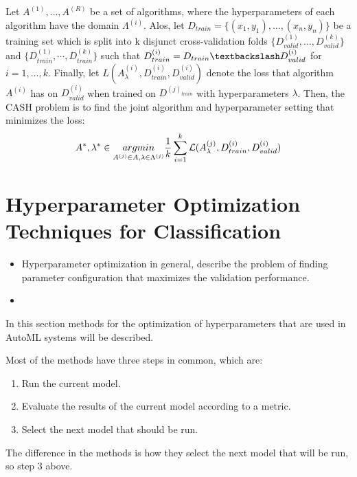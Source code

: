\begin{definition} 
\label{def:cash}
Let $A^(1), \dots, A^(R)$ be a set of algorithms, where the hyperparameters of each algorithm have the domain $\Lambda^(i)$.
Alos, let $ D_{train} =  \lbrace (x_1, y_1), \dots, (x_n, y_n) \rbrace$ be a training set which is split into k  disjunct cross-validation folds $\lbrace D^{(1)}_{valid}, \dots, D^{(k)}_{valid} \rbrace$ and $\lbrace D^{(1)}_{train}, \cdots, D^{(k)}_{train} \rbrace$  such that $D^{(i)}_{train} = D_{train} \textbackslash D^{(i)}_{valid}$ for $i=1, \dots, k$.
Finally, let $L( A^{(i)}_{\lambda}, D^{(i)}_{train}, D^{(i)}_{valid})$ denote the loss that algorithm $A^{(i)}$ has on $D^{(i)}_{valid}$ when trained on $D^{(j)_{train}}$ with hyperparameters $\lambda$.
Then, the \gls{CASH} problem is to find the joint algorithm and hyperparameter setting that minimizes the loss:
\begin{equation*}
    A^*, \lambda^* \in \underset{A^{(j)}\in A, \lambda \in \Lambda^{(j)}}{argmin} \frac{1}{k} \sum_{i=1}^k \mathcal{L}(A^{(j)}_{\lambda}, D^{(i)}_{train}, D^{(i)}_{valid})
\end{equation*}

\end{definition}



\section{Hyperparameter Optimization Techniques for Classification}

\begin{itemize}
    \item Hyperparameter optimization in general, describe the problem of finding parameter configuration that maximizes the validation performance.
    \item 
\end{itemize}
In this section methods for the optimization of hyperparameters that are used in AutoML systems will be described.

Most of the methods have three steps in common, which are:
\begin{enumerate}
    \item Run the current model.
    \item Evaluate the results of the current model according to a metric.
    \item Select the next model that should be run.
\end{enumerate}
The difference in the methods is how they select the next model that will be run, so step 3 above. 

